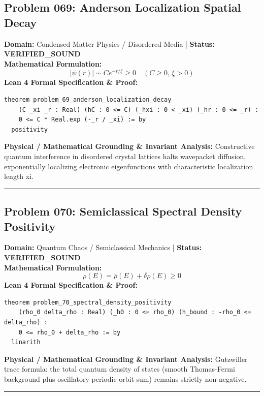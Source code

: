 \documentclass[10pt,a4paper]{article}
\begin{document}
\subsection*{Problem 069: Anderson Localization Spatial Decay}
\textbf{Domain:} Condensed Matter Physics / Disordered Media \quad | \quad \textbf{Status:} \textcolor{green!70!black}{\textbf{VERIFIED\_SOUND}}\\
\textbf{Mathematical Formulation:}
\begin{equation*}
  |\psi(r)| \sim C e^{-r/\xi} \ge 0 \quad (C \ge 0, \, \xi > 0)
\end{equation*}
\textbf{Lean 4 Formal Specification \& Proof:}
\begin{lstlisting}
theorem problem_69_anderson_localization_decay
    (C _xi _r : Real) (hC : 0 <= C) (_hxi : 0 < _xi) (_hr : 0 <= _r) :
    0 <= C * Real.exp (-_r / _xi) := by
  positivity
\end{lstlisting}
\textbf{Physical / Mathematical Grounding \& Invariant Analysis:}
Constructive quantum interference in disordered crystal lattices halts wavepacket diffusion, exponentially localizing electronic eigenfunctions with characteristic localization length xi.
\vspace{0.8em}\hrule\vspace{0.8em}
\subsection*{Problem 070: Semiclassical Spectral Density Positivity}
\textbf{Domain:} Quantum Chaos / Semiclassical Mechanics \quad | \quad \textbf{Status:} \textcolor{green!70!black}{\textbf{VERIFIED\_SOUND}}\\
\textbf{Mathematical Formulation:}
\begin{equation*}
  \rho(E) = \bar{\rho}(E) + \delta\rho(E) \ge 0
\end{equation*}
\textbf{Lean 4 Formal Specification \& Proof:}
\begin{lstlisting}
theorem problem_70_spectral_density_positivity
    (rho_0 delta_rho : Real) (_h0 : 0 <= rho_0) (h_bound : -rho_0 <= delta_rho) :
    0 <= rho_0 + delta_rho := by
  linarith
\end{lstlisting}
\textbf{Physical / Mathematical Grounding \& Invariant Analysis:}
Gutzwiller trace formula: the total quantum density of states (smooth Thomas-Fermi background plus oscillatory periodic orbit sum) remains strictly non-negative.
\vspace{0.8em}\hrule\vspace{0.8em}
\end{document}
